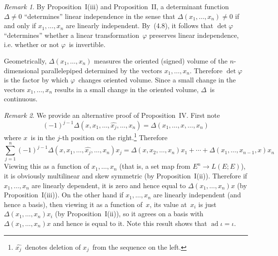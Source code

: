 \documentclass[letterpaper,12pt]{article}
\DeclareMathOperator{\ad}{ad}
\newcommand{\delete}{\widehat}
\theoremstyle{definition}
\theoremstyle{remark}
\newtheorem*{rmk}{Remark}
\begin{document}
\begin{rmk}
By Proposition~I(iii) and Proposition~II, a determinant function \(\Delta\ne 0\) ``determines'' linear independence in the sense that \(\Delta(x_1,\ldots,x_n)\ne0\) if and only if \(x_1,\ldots,x_n\) are linearly independent. By~(4.8), it follows that \(\det\varphi\) ``determines'' whether a linear transformation~\(\varphi\) preserves linear independence, i.e. whether or not \(\varphi\)~is invertible.

Geometrically, \(\Delta(x_1,\ldots,x_n)\) measures the oriented (signed) volume of the \(n\)-dimensional parallelepiped determined by the vectors \(x_1,\ldots,x_n\). Therefore \(\det\varphi\) is the factor by which \(\varphi\)~changes oriented volume. Since a small change in the vectors \(x_1,\ldots,x_n\) results in a small change in the oriented volume, \(\Delta\)~is continuous.
\end{rmk}

\begin{rmk}
We provide an alternative proof of Proposition~IV. First note
\[(-1)^{j-1}\Delta(x,x_1,\ldots,\delete{x_j},\ldots,x_n)=\Delta(x_1,\ldots,x,\ldots,x_n)\]
where \(x\)~is in the \(j\)-th position on the right.\footnote{\(\delete{x_j}\)~denotes deletion of \(x_j\)~from the sequence on the left.} Therefore
\[\sum_{j=1}^n(-1)^{j-1}\Delta(x,x_1,\ldots,\delete{x_j},\ldots,x_n)x_j=\Delta(x,x_2,\ldots,x_n)x_1+\cdots+\Delta(x_1,\ldots,x_{n-1},x)x_n\]
Viewing this as a function of \(x_1,\ldots,x_n\) (that is, a set map from \(E^n\to L(E;E)\)), it is obviously multilinear and skew symmetric (by Proposition~I(ii)). Therefore if \(x_1,\ldots,x_n\) are linearly dependent, it is zero and hence equal to \(\Delta(x_1,\ldots,x_n)x\) (by Proposition~I(iii)). On the other hand if \(x_1,\ldots,x_n\) are linearly independent (and hence a basis), then viewing it as a function of~\(x\), its value at~\(x_i\) is just \(\Delta(x_1,\ldots,x_n)x_i\) (by Proposition~I(ii)), so it agrees on a basis with \(\Delta(x_1,\ldots,x_n)x\) and hence is equal to it. Note this result shows that \(\ad\iota=\iota\).
\end{rmk}
\end{document}
